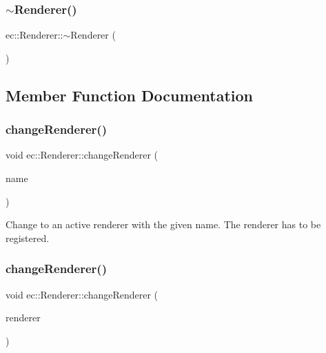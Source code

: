\mbox{\label{classec_1_1_renderer_ab0a97bd174127b670899477a576d1fe6}} 
\subsubsection{\texorpdfstring{$\sim$\+Renderer()}{~Renderer()}}
{\footnotesize\ttfamily ec\+::\+Renderer\+::$\sim$\+Renderer (\begin{DoxyParamCaption}{ }\end{DoxyParamCaption})\hspace{0.3cm}{\ttfamily [default]}}



\subsection{Member Function Documentation}
\mbox{\label{classec_1_1_renderer_abb876cb59df2478b52926782e2d0a0a9}} 
\subsubsection{\texorpdfstring{change\+Renderer()}{changeRenderer()}\hspace{0.1cm}{\footnotesize\ttfamily [1/2]}}
{\footnotesize\ttfamily void ec\+::\+Renderer\+::change\+Renderer (\begin{DoxyParamCaption}\item[{const std\+::string \&}]{name }\end{DoxyParamCaption})}

Change to an active renderer with the given name. The renderer has to be registered. \mbox{\label{classec_1_1_renderer_aff1e2f129ce6b24a5ed1e27730a13762}} 
\subsubsection{\texorpdfstring{change\+Renderer()}{changeRenderer()}\hspace{0.1cm}{\footnotesize\ttfamily [2/2]}}
{\footnotesize\ttfamily void ec\+::\+Renderer\+::change\+Renderer (\begin{DoxyParamCaption}\item[{\mbox{\hyperlink{classec_1_1_scene_renderer}{Scene\+Renderer}} $\ast$}]{renderer }\end{DoxyParamCaption})}

